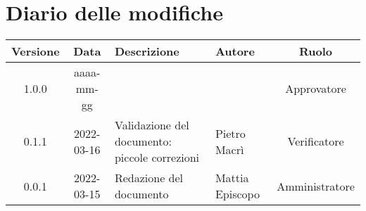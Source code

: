 \section*{Diario delle modifiche}
	\begin{center}
	\renewcommand{\arraystretch}{1.8}
	\begin{tabular}{ |c|c|m{12em}|m{7em}|c| }
	\hline
	\textbf{Versione} & \textbf{Data} & \textbf{Descrizione} &  \textbf{Autore} &  \textbf{Ruolo} \\
	\hline
	1.0.0 & aaaa-mm-gg & & & Approvatore\\
	\hline
	0.1.1 & 2022-03-16 & Validazione del documento: piccole correzioni & Pietro Macrì & Verificatore\\
	\hline
	0.0.1 & 2022-03-15 & Redazione del documento & Mattia Episcopo & Amministratore\\
	\hline
	\end{tabular}
	\end{center}
	\newpage